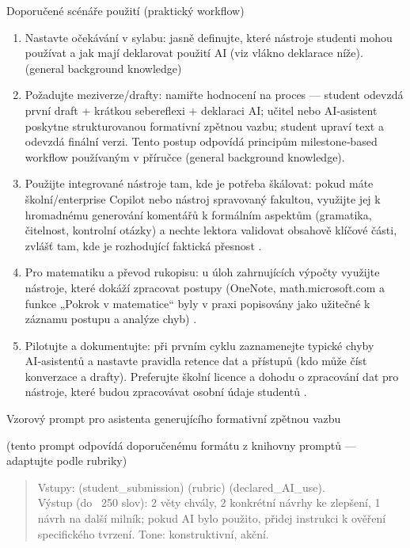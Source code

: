 Doporučené scénáře použití (praktický workflow)
\begin{enumerate}
  \item Nastavte očekávání v sylabu: jasně definujte, které nástroje studenti mohou používat a jak mají deklarovat použití AI (viz vlákno deklarace níže). (general background knowledge)
  \item Požadujte meziverze/drafty: namiřte hodnocení na proces — student odevzdá první draft + krátkou sebereflexi + deklaraci AI; učitel nebo AI‑asistent poskytne strukturovanou formativní zpětnou vazbu; student upraví text a odevzdá finální verzi. Tento postup odpovídá principům milestone‑based workflow používaným v příručce (general background knowledge).
  \item Použijte integrované nástroje tam, kde je potřeba škálovat: pokud máte školní/enterprise Copilot nebo nástroj spravovaný fakultou, využijte jej k hromadnému generování komentářů k formálním aspektům (gramatika, čitelnost, kontrolní otázky) a nechte lektora validovat obsahově klíčové části, zvlášť tam, kde je rozhodující faktická přesnost \cite{kb_ai_101_tipu_pdf_04e4a115_page_3_1}.
  \item Pro matematiku a převod rukopisu: u úloh zahrnujících výpočty využijte nástroje, které dokáží zpracovat postupy (OneNote, math.microsoft.com a funkce „Pokrok v matematice“ byly v praxi popisovány jako užitečné k záznamu postupu a analýze chyb) \cite{kb_ai_101_tipu_pdf_04e4a115_page_8_1}.
  \item Pilotujte a dokumentujte: při prvním cyklu zaznamenejte typické chyby AI‑asistentů a nastavte pravidla retence dat a přístupů (kdo může číst konverzace a drafty). Preferujte školní licence a dohodu o zpracování dat pro nástroje, které budou zpracovávat osobní údaje studentů \cite{kb_ai_101_tipu_pdf_04e4a115_page_3_1}.
\end{enumerate}

Vzorový prompt pro asistenta generujícího formativní zpětnou vazbu
\vspace{0.5em}

\noindent (tento prompt odpovídá doporučenému formátu z knihovny promptů — adaptujte podle rubriky)
\begin{quote}
  Vstupy: (student_submission) (rubric) (declared_AI_use). \\
  Výstup (do ~250 slov): 2 věty chvály, 2 konkrétní návrhy ke zlepšení, 1 návrh na další milník; pokud AI bylo použito, přidej instrukci k ověření specifického tvrzení. Tone: konstruktivní, akční.
\end{quote}
\vspace{0.5em}

